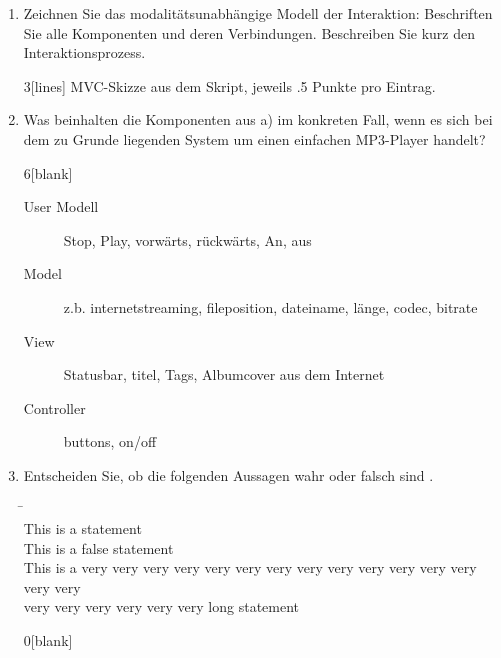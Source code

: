 	
\begin{enumerate}
\item Zeichnen Sie das modalitätsunabhängige Modell der Interaktion: Beschriften
Sie alle Komponenten und deren Verbindungen. Beschreiben Sie kurz den
Interaktionsprozess.

\begin{solution}{3}[lines]
MVC-Skizze aus dem Skript, jeweils .5 Punkte pro Eintrag.
\end{solution}

\item Was beinhalten die Komponenten aus a) im konkreten Fall, wenn es sich bei
dem zu Grunde liegenden System um einen einfachen MP3-Player handelt?

\begin{solution}{6}[blank]
\begin{description} 
\item[User Modell] Stop, Play, vorwärts, rückwärts, An, aus
\item[Model] z.b. internetstreaming, fileposition, dateiname, länge, codec,
bitrate
\item[View] Statusbar, titel, Tags, Albumcover aus dem Internet 
\item[Controller] buttons, on/off
\end{description}
\end{solution}

\item Entscheiden Sie, ob die folgenden Aussagen wahr oder falsch sind \cwbla.
\begin{tabbing}
\hphantom{\hspace{0.2cm}\boxes\hspace{0.1cm}}\=\kill
\cwheader\\
\boxes\> This is a statement\\
\boxes\> This is a false statement\\
\boxes\> This is a very very very very very very very very very very very very very very very\\
      \> very very very very very very long statement\\
\end{tabbing}

\begin{solution}{0}[blank]
        \Wahr
        \Falsch
        \Wahr
\end{solution}
\end{enumerate}
